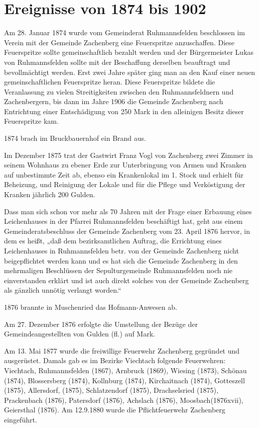 \documentclass[12pt,a4pager]{book}
\begin{document}
\section{Ereignisse von 1874 bis 1902}

Am 28. Januar 1874 wurde vom Gemeinderat Ruhmannsfelden beschlossen im Verein
mit der Gemeinde Zachenberg eine Feuerspritze anzuschaffen. Diese Feuerspritze
sollte gemeinschaftlich bezahlt werden und der Bürgermeister Lukas von
Ruhmannsfelden sollte mit der Beschaffung derselben beauftragt und
bevollmächtigt werden. Erst zwei Jahre später ging man an den Kauf einer neuen
gemeinschaftlichen Feuerspritze heran. Diese Feuerspritze bildete die
Veranlassung zu vielen Streitigkeiten zwischen den Ruhmannsfeldnern und
Zachenbergern, bis dann im Jahre 1906 die Gemeinde Zachenberg nach Entrichtung
einer Entschädigung von 250 Mark in den alleinigen Besitz dieser Feuerspritze
kam.

1874 brach im Bruckbauernhof ein Brand aus.

Im Dezember 1875 trat der Gastwirt Franz Vogl von Zachenberg zwei Zimmer in
seinem Wohnhaus zu ebener Erde zur Unterbringung von Armen und Kranken auf
unbestimmte Zeit ab, ebenso ein Krankenlokal im 1. Stock und erhielt für
Beheizung, und Reinigung der Lokale und für die Pflege und Verköstigung der
Kranken jährlich 200 Gulden.

Dass man sich schon vor mehr als 70 Jahren mit der Frage einer Erbauung eines
Leichenhauses in der Pfarrei Ruhmannsfelden beschäftigt hat, geht aus einem
Gemeinderatsbeschluss der Gemeinde Zachenberg vom 23. April 1876 hervor, in dem
es heißt, „daß dem bezirksamtlichen Auftrag, die Errichtung eines Leichenhauses
in Ruhmannsfelden betr. von der Gemeinde Zachenberg nicht beigepflichtet werden
kann und es hat sich die Gemeinde Zachenberg in den mehrmaligen Beschlüssen der
Sepulturgemeinde Ruhmannsfelden noch nie einverstanden erklärt und ist auch
direkt solches von der Gemeinde Zachenberg als gänzlich unnötig verlangt
worden.“

1876 brannte in Muschenried das Hofmann-Anwesen ab.

Am 27. Dezember 1876 erfolgte die Umstellung der Bezüge der Gemeindeangestellten
von Gulden (fl.) auf Mark.

Am 13. Mai 1877 wurde die freiwillige Feuerwehr Zachenberg gegründet und
ausgerüstet. Damals gab es im Bezirke Viechtach folgende Feuerwehren: Viechtach,
Ruhmannsfelden (1867), Arnbruck (1869), Wiesing (1873), Schönau (1874),
Blossersberg (1874), Kollnburg (1874), Kirchaitnach (1874), Gotteszell (1875),
Allersdorf, (1875), Schlatzendorf (1875), Drachselsried (1875), Prackenbach
(1876), Patersdorf (1876), Achslach (1876), Moosbach(1876xvii), Geiersthal
(1876). Am 12.9.1880 wurde die Pflichtfeuerwehr Zachenberg eingeführt.
\end{document}
